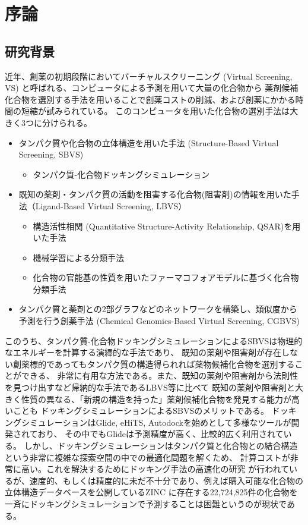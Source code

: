 \chapter{序論}
\section{研究背景}\label{sec:background}
近年、創薬の初期段階においてバーチャルスクリーニング (Virtual Screening, VS) と呼ばれる、コンピュータによる予測を用いて大量の化合物から
薬剤候補化合物を選別する手法を用いることで創薬コストの削減、および創薬にかかる時間の短縮が試みられている。
このコンピュータを用いた化合物の選別手法は大きく3つに分けられる。

\begin{itemize}
\item タンパク質や化合物の立体構造を用いた手法 (Structure-Based Virtual Screening, SBVS)
	\begin{itemize}
	\item タンパク質-化合物ドッキングシミュレーション
	\end{itemize}
\item 既知の薬剤・タンパク質の活動を阻害する化合物(阻害剤)の情報を用いた手法（Ligand-Based Virtual Screening, LBVS）
	\begin{itemize}
	\item 構造活性相関 (Quantitative Structure-Activity Relationship, QSAR)を用いた手法\citetodo{}
	\item 機械学習による分類手法\citetodo{}
	\item 化合物の官能基の性質を用いたファーマコフォアモデルに基づく化合物分類手法\citetodo{}
	\end{itemize}
\item タンパク質と薬剤との2部グラフなどのネットワークを構築し、類似度から予測を行う創薬手法 
	(Chemical Genomics-Based Virtual Screening, CGBVS)
\end{itemize}

このうち、タンパク質-化合物ドッキングシミュレーションによるSBVSは物理的なエネルギーを計算する演繹的な手法であり、
既知の薬剤や阻害剤が存在しない創薬標的であってもタンパク質の構造得られれば薬物候補化合物を選別することができる、
非常に有用な方法である。また、既知の薬剤や阻害剤から法則性を見つけ出すなど帰納的な手法であるLBVS等に比べて
既知の薬剤や阻害剤と大きく性質の異なる、「新規の構造を持った」薬剤候補化合物を発見する能力が高いことも
ドッキングシミュレーションによるSBVSのメリットである。
ドッキングシミュレーションはGlide\citetodo{}, eHiTS\citetodo{}, Autodock\citetodo{}を始めとして多様なツールが開発されており、
その中でもGlideは予測精度が高く、比較的広く利用されている。
しかし、ドッキングシミュレーションはタンパク質と化合物との結合構造という非常に複雑な探索空間の中での最適化問題を解くため、
計算コストが非常に高い。これを解決するためにドッキング手法の高速化の研究
が行われているが、速度的、もしくは精度的に未だ不十分であり、例えば購入可能な化合物の立体構造データベースを公開しているZINC
\citetodo{}に存在する22,724,825件の化合物を一斉にドッキングシミュレーションで予測することは困難というのが現状である。

